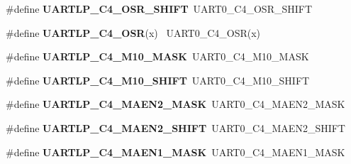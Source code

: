\begin{DoxyCompactItemize}
\item 
\hypertarget{group___backward___compatibility___symbols_gafb1dd8f9e942cb49f32e0be294bee876}{}\#define {\bfseries U\+A\+R\+T\+L\+P\+\_\+\+C4\+\_\+\+O\+S\+R\+\_\+\+S\+H\+I\+F\+T}~U\+A\+R\+T0\+\_\+\+C4\+\_\+\+O\+S\+R\+\_\+\+S\+H\+I\+F\+T\label{group___backward___compatibility___symbols_gafb1dd8f9e942cb49f32e0be294bee876}

\item 
\hypertarget{group___backward___compatibility___symbols_ga47b840bc000a94a56830c61a84b611f5}{}\#define {\bfseries U\+A\+R\+T\+L\+P\+\_\+\+C4\+\_\+\+O\+S\+R}(x)                                              ~U\+A\+R\+T0\+\_\+\+C4\+\_\+\+O\+S\+R(x)\label{group___backward___compatibility___symbols_ga47b840bc000a94a56830c61a84b611f5}

\item 
\hypertarget{group___backward___compatibility___symbols_gae6f095de7ec64e7c5f070cace84825f2}{}\#define {\bfseries U\+A\+R\+T\+L\+P\+\_\+\+C4\+\_\+\+M10\+\_\+\+M\+A\+S\+K}~U\+A\+R\+T0\+\_\+\+C4\+\_\+\+M10\+\_\+\+M\+A\+S\+K\label{group___backward___compatibility___symbols_gae6f095de7ec64e7c5f070cace84825f2}

\item 
\hypertarget{group___backward___compatibility___symbols_ga5bf55e06cfac817fc0cc879b5bd8df17}{}\#define {\bfseries U\+A\+R\+T\+L\+P\+\_\+\+C4\+\_\+\+M10\+\_\+\+S\+H\+I\+F\+T}~U\+A\+R\+T0\+\_\+\+C4\+\_\+\+M10\+\_\+\+S\+H\+I\+F\+T\label{group___backward___compatibility___symbols_ga5bf55e06cfac817fc0cc879b5bd8df17}

\item 
\hypertarget{group___backward___compatibility___symbols_ga90e33c5bb1be6d39e1d0f937253daf0b}{}\#define {\bfseries U\+A\+R\+T\+L\+P\+\_\+\+C4\+\_\+\+M\+A\+E\+N2\+\_\+\+M\+A\+S\+K}~U\+A\+R\+T0\+\_\+\+C4\+\_\+\+M\+A\+E\+N2\+\_\+\+M\+A\+S\+K\label{group___backward___compatibility___symbols_ga90e33c5bb1be6d39e1d0f937253daf0b}

\item 
\hypertarget{group___backward___compatibility___symbols_ga9b129e14e5aac5ef9707937d91fd0046}{}\#define {\bfseries U\+A\+R\+T\+L\+P\+\_\+\+C4\+\_\+\+M\+A\+E\+N2\+\_\+\+S\+H\+I\+F\+T}~U\+A\+R\+T0\+\_\+\+C4\+\_\+\+M\+A\+E\+N2\+\_\+\+S\+H\+I\+F\+T\label{group___backward___compatibility___symbols_ga9b129e14e5aac5ef9707937d91fd0046}

\item 
\hypertarget{group___backward___compatibility___symbols_gaf8e8a31f6af1dbfe4e930d0c7bffe375}{}\#define {\bfseries U\+A\+R\+T\+L\+P\+\_\+\+C4\+\_\+\+M\+A\+E\+N1\+\_\+\+M\+A\+S\+K}~U\+A\+R\+T0\+\_\+\+C4\+\_\+\+M\+A\+E\+N1\+\_\+\+M\+A\+S\+K\label{group___backward___compatibility___symbols_gaf8e8a31f6af1dbfe4e930d0c7bffe375}


\end{DoxyCompactItemize}
